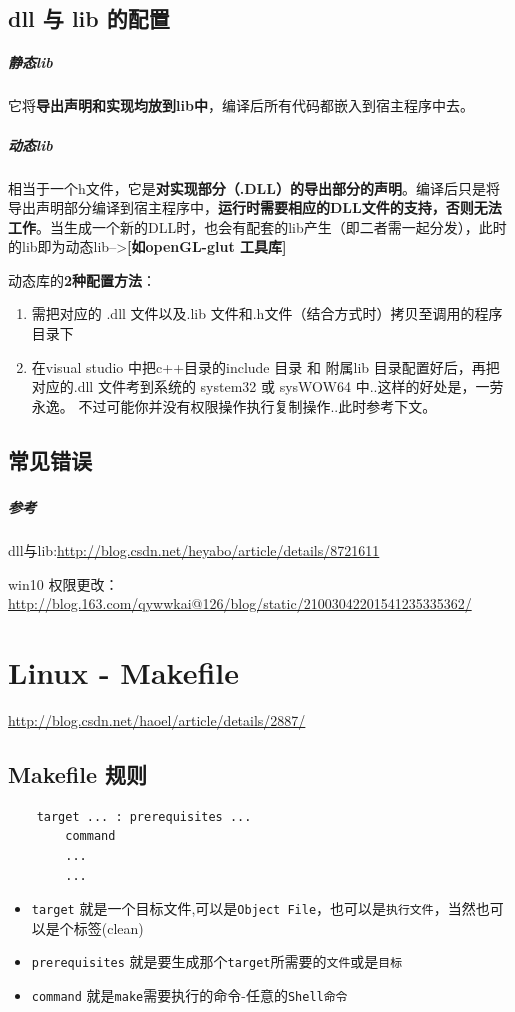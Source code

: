 \documentclass[UTF8,a4paper,12pt]{ctexbook} %
\begin{document}
		\subsection{dll 与 lib 的配置}
			\subparagraph{静态lib}它将\textbf{导出声明和实现均放到lib中}，编译后所有代码都嵌入到宿主程序中去。
			\subparagraph{动态lib}相当于一个h文件，它是\textbf{对实现部分（.DLL）的导出部分的声明}。编译后只是将导出声明部分编译到宿主程序中，\textbf{运行时需要相应的DLL文件的支持，否则无法工作}。当生成一个新的DLL时，也会有配套的lib产生（即二者需一起分发），此时的lib即为动态lib-->\textbf{[如openGL-glut 工具库]}
			
			动态库的\textbf{2种配置方法}：
				\begin{enumerate}[itemindent = 2em]
					\item 需把对应的 .dll 文件以及.lib 文件和.h文件（结合方式时）拷贝至调用的程序目录下
					\item 在visual studio 中把c++目录的include 目录 和 附属lib 目录配置好后，再把对应的.dll 文件考到系统的 system32 或 sysWOW64 中..这样的好处是，一劳永逸。 不过可能你并没有权限操作执行复制操作..此时参考下文。
				\end{enumerate}
		
		\subsection{常见错误}
			\subsubsection{}	
			\subparagraph{参考}
			dll与lib:\url{http://blog.csdn.net/heyabo/article/details/8721611}
			
			win10 权限更改：\url{http://blog.163.com/qywwkai@126/blog/static/21003042201541235335362/}
	\section{Linux - Makefile}
	
			\url{http://blog.csdn.net/haoel/article/details/2887/}
		\subsection{Makefile 规则}
			\begin{lstlisting}
	target ... : prerequisites ...
		command
		...
		...
			\end{lstlisting}
			
			\begin{itemize}
				\item \verb|target| 就是一个目标文件,可以是\verb|Object File|，也可以是\verb|执行文件|，当然也可以是个标签(clean)
				\item \verb|prerequisites| 就是要生成那个\verb|target|所需要的\verb|文件|或是\verb|目标|
				\item \verb|command| 就是\verb|make|需要执行的命令-任意的\verb|Shell命令|
			\end{itemize}
			
\end{document}
